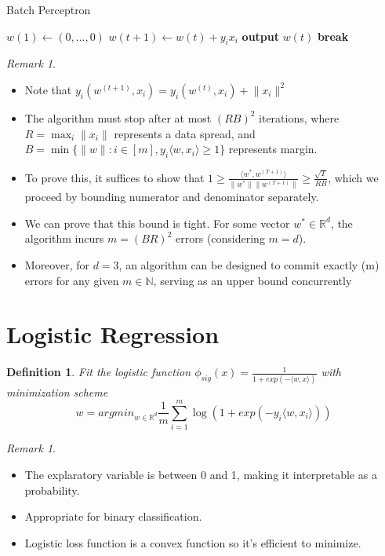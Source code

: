 \documentclass{article}
\newtheorem{definition}{Definition}
\theoremstyle{remark}
\newtheorem{remark}[example]{Remark}
\begin{document}
\begin{algorithm}[H]
    \caption{Batch Perceptron}
    \begin{algorithmic}[1]
        \State $w(1) \gets (0, \ldots, 0)$
                \State $w(t+1) \gets w(t) + y_i x_i$
            \Else
                \State \textbf{output} $w(t)$
                \State \textbf{break}
            \EndIf
        \EndFor
    \EndFunction
    \end{algorithmic}
\end{algorithm}

\begin{remark}
\begin{itemize}
\item Note that $y_i(w^{(t+1)}, x_i)=y_i(w^{(t)}, x_i)+\lVert x_i\rVert^2$
\item The algorithm must stop after at most $(RB)^2$ iterations, where $R=\max_i\lVert x_i\rVert$ represents a data spread, and \\
$B=\min\{\lVert w\rVert: i\in [m], y_i\langle w,x_i\rangle\geq 1\}$ represents 
margin.
\item To prove this, it suffices to show that $1\geq\frac{\langle w^*, w^{(T+1)}\rangle}{\lVert w^*\rVert\lVert w^{(T+1)}\rVert}\geq\frac{\sqrt T}{RB}$, which we proceed by bounding numerator and denominator separately.
\item We can prove that this bound is tight. For some vector $w^* \in \mathbb{R}^d$, the algorithm incurs $m = (BR)^2$ errors (considering $m = d$).
\item Moreover, for $d = 3$, an algorithm can be designed to commit exactly (m) errors for any given $m \in \mathbb{N}$, serving as an upper bound concurrently        \end{itemize}
\end{remark}

\section*{Logistic Regression}
\begin{definition}
Fit the logistic function $\phi_{sig}(x)=\frac 1{1+exp(-\langle w,x\rangle)}$
 with minimization scheme 
\[
w=argmin_{w\in\mathbb{R}^d} \frac 1m\sum^m_{i=1}
\log(1+exp(-y_i\langle w,x_i\rangle))
\]
\end{definition}
\begin{remark}
\begin{itemize}
\item The explaratory variable is between 0 and 1, making it interpretable as a probability.
\item Appropriate for binary classification.
\item Logistic loss function is a convex function so it's efficient to minimize.
\end{itemize}
\end{remark}
\end{document}

